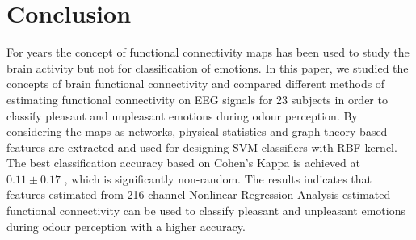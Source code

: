 \section{Conclusion}
For years the concept of functional connectivity maps has been used to study the brain activity but not for classification of emotions. In this paper, we studied the concepts of brain functional connectivity and compared different methods of estimating functional connectivity on EEG signals for 23 subjects in order to classify pleasant and unpleasant emotions during odour perception. By considering the maps as networks, physical statistics and graph theory based features are extracted and used for designing SVM classifiers with RBF kernel. The best classification accuracy based on Cohen's Kappa is achieved at $0.11 \pm 0.17$ , which is significantly non-random. The results indicates that features estimated from 216-channel Nonlinear Regression Analysis estimated functional connectivity can be used to classify pleasant and unpleasant emotions during odour perception with a higher accuracy.  
